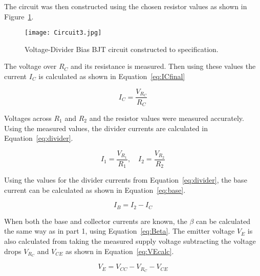 \documentclass{article}
\begin{document}
The circuit was then constructed using the chosen resistor values as shown in Figure~\ref{fig:circuit3}.

\begin{figure}[H]
    \centering
    \texttt{[image: Circuit3.jpg]}
    \caption{Voltage-Divider Bias BJT circuit constructed to specification.}
    \label{fig:circuit3}
\end{figure}

The voltage over \(R_C\) and its resistance is measured. Then using these values the current \(I_C\) is calculated as shown in Equation~\ref{eq:ICfinal}

\begin{equation}
    \label{eq:ICfinal}
    I_C = \frac{V_{R_C}}{R_C}
\end{equation}


Voltages across \(R_1\) and \(R_2\) and the resistor values were measured accurately.
Using the measured values, the divider currents are calculated in Equation~\ref{eq:divider}.

\begin{equation}
    \label{eq:divider}
    I_1 = \frac{V_{R_1}}{R_1}, \quad
    I_2 = \frac{V_{R_2}}{R_2}
\end{equation}

Using the values for the divider currents from Equation~\ref{eq:divider}, the base current can be calculated as shown in Equation~\ref{eq:base}.

\begin{equation}
\label{eq:base}
I_B = I_2 - I_C
\end{equation}

When both the base and collector currents are known, the \(\beta\) can be calculated the same way as in part 1, using Equation~\ref{eq:Beta}.
The emitter voltage \(V_E\) is also calculated from taking the measured supply voltage subtracting the voltage drops \(V_{R_C}\) and \(V_{CE}\) as shown in Equation~\ref{eq:VEcalc}.

\begin{equation}
\label{eq:VEcalc}
V_E = V_{CC} - V_{R_C} - V_{CE}
\end{equation}
\end{document}
